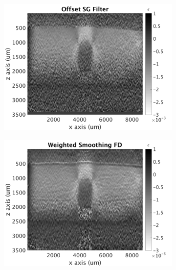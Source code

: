 \begin{figure}[hb!]
\begin{subfigure}{0.49\textwidth}
        \includegraphics[width=\textwidth]{figures/offset_sg}
	\end{subfigure}
    \begin{subfigure}{0.49\textwidth}
    	\centering
        \includegraphics[width=\textwidth]{figures/weighted_fd}
    \end{subfigure}
    \\
    \begin{subfigure}{0.49\textwidth}
    	\centering

\end{subfigure}
\end{figure}
